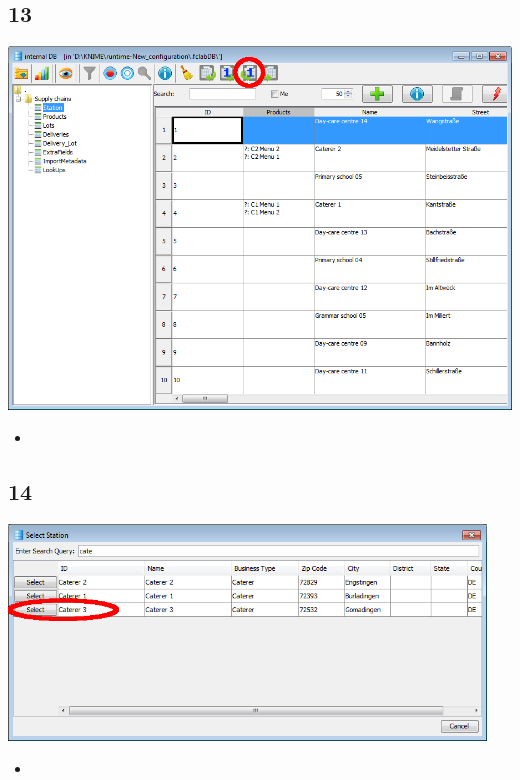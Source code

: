 \documentclass{beamer}
\begin{document}
\subsection{13}
\begin{frame}
	\begin{center}
  		\includegraphics[height=0.6\textheight]{13.png}
	\end{center}
	\begin{itemize}
		\item
	\end{itemize}
\end{frame}

\subsection{14}
\begin{frame}
	\begin{center}
  		\includegraphics[width=0.95\textwidth]{14.png}
	\end{center}
	\begin{itemize}
		\item
	\end{itemize}
\end{frame}
\end{document}
